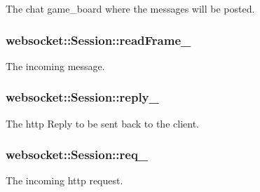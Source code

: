 The chat game\+\_\+board where the messages will be posted. 

\subsubsection[{\texorpdfstring{read\+Frame\+\_\+}{readFrame_}}]{ websocket\+::\+Session\+::read\+Frame\+\_\+\hspace{0.3cm}{\ttfamily [private]}}\hypertarget{classwebsocket_1_1Session_a2ea49f75569589cc80cb9dbcfa7707ee}{}\label{classwebsocket_1_1Session_a2ea49f75569589cc80cb9dbcfa7707ee}


The incoming message. 

\subsubsection[{\texorpdfstring{reply\+\_\+}{reply_}}]{ websocket\+::\+Session\+::reply\+\_\+\hspace{0.3cm}{\ttfamily [private]}}\hypertarget{classwebsocket_1_1Session_a938563bfc401a7446f87a60acc642800}{}\label{classwebsocket_1_1Session_a938563bfc401a7446f87a60acc642800}


The http Reply to be sent back to the client. 

\subsubsection[{\texorpdfstring{req\+\_\+}{req_}}]{ websocket\+::\+Session\+::req\+\_\+\hspace{0.3cm}{\ttfamily [private]}}\hypertarget{classwebsocket_1_1Session_a80b1e6b3657a3c3528acd3c9b4e453a5}{}\label{classwebsocket_1_1Session_a80b1e6b3657a3c3528acd3c9b4e453a5}


The incoming http request. 

